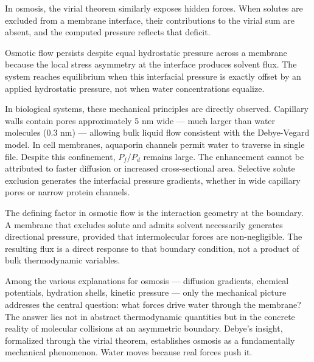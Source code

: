 In osmosis, the virial theorem similarly exposes hidden forces. When solutes are excluded from a membrane interface, their contributions to the virial sum are absent, and the computed pressure reflects that deficit.

Osmotic flow persists despite equal hydrostatic pressure across a membrane because the local stress asymmetry at the interface produces solvent flux. The system reaches equilibrium when this interfacial pressure is exactly offset by an applied hydrostatic pressure, not when water concentrations equalize.

In biological systems, these mechanical principles are directly observed. Capillary walls contain pores approximately 5 nm wide — much larger than water molecules (0.3 nm) — allowing bulk liquid flow consistent with the Debye-Vegard model. In cell membranes, aquaporin channels permit water to traverse in single file. Despite this confinement, $P_f / P_d$ remains large. The enhancement cannot be attributed to faster diffusion or increased cross-sectional area. Selective solute exclusion generates the interfacial pressure gradients, whether in wide capillary pores or narrow protein channels.

The defining factor in osmotic flow is the interaction geometry at the boundary. A membrane that excludes solute and admits solvent necessarily generates directional pressure, provided that intermolecular forces are non-negligible. The resulting flux is a direct response to that boundary condition, not a product of bulk thermodynamic variables.

Among the various explanations for osmosis — diffusion gradients, chemical potentials, hydration shells, kinetic pressure — only the mechanical picture addresses the central question: what forces drive water through the membrane? The answer lies not in abstract thermodynamic quantities but in the concrete reality of molecular collisions at an asymmetric boundary. Debye's insight, formalized through the virial theorem, establishes osmosis as a fundamentally mechanical phenomenon. Water moves because real forces push it.



